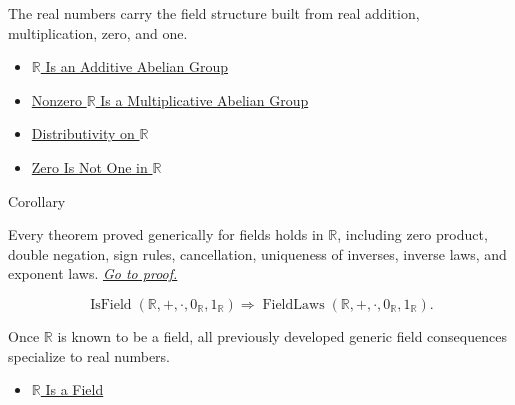 \begin{remark*}[Interpretation]
The real numbers carry the field structure built from real addition, multiplication, zero, and one.
\end{remark*}

\begin{dependencies}
\begin{itemize}
  \item \hyperref[thm:r-additive-abelian-group]{$\mathbb{R}$ Is an Additive Abelian Group}
  \item \hyperref[thm:r-nonzero-multiplicative-abelian-group]{Nonzero $\mathbb{R}$ Is a Multiplicative Abelian Group}
  \item \hyperref[thm:distributivity-on-r]{Distributivity on $\mathbb{R}$}
  \item \hyperref[thm:zero-not-one-in-r]{Zero Is Not One in $\mathbb{R}$}
\end{itemize}
\end{dependencies}

\begin{corollarybox}{Corollary}
\begin{corollary}
\label{cor:field-laws-on-r}
Every theorem proved generically for fields holds in $\mathbb{R}$, including
zero product, double negation, sign rules, cancellation, uniqueness of
inverses, inverse laws, and exponent laws.
\hyperref[prf:field-laws-on-r]{\textit{Go to proof.}}
\end{corollary}
\end{corollarybox}

\begin{remark*}
\[
\operatorname{IsField}(\mathbb{R},+,\cdot,0_{\mathbb{R}},1_{\mathbb{R}})
\Longrightarrow
\operatorname{FieldLaws}(\mathbb{R},+,\cdot,0_{\mathbb{R}},1_{\mathbb{R}}).
\]
\end{remark*}

\begin{remark*}[Interpretation]
Once $\mathbb{R}$ is known to be a field, all previously developed generic field consequences specialize to real numbers.
\end{remark*}

\begin{dependencies}
\begin{itemize}
  \item \hyperref[thm:r-is-a-field]{$\mathbb{R}$ Is a Field}
\end{itemize}
\end{dependencies}

